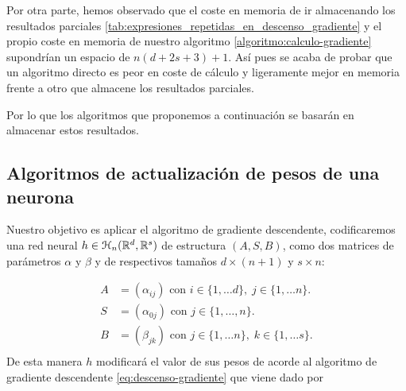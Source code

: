 Por otra parte, hemos observado que el coste en memoria de ir almacenando los resultados parciales \ref{tab:expresiones_repetidas_en_descenso_gradiente} y el propio coste en memoria de nuestro algoritmo \ref{algoritmo:calculo-gradiente} supondrían un espacio de $n (d + 2s +3) +1$.
Así pues se acaba de probar que un algoritmo directo es peor en coste de cálculo y ligeramente mejor en memoria frente a otro que almacene los resultados parciales. 

Por lo que los algoritmos que proponemos a continuación se basarán en almacenar estos resultados. 

\subsection{Algoritmos de actualización de pesos de una neurona}

Nuestro objetivo es aplicar el algoritmo de gradiente descendente, codificaremos una red neural $h \in \mathcal{H}_n(\mathbb{R}^d,\mathbb{R}^s)$ de estructura $(A,S,B)$, como dos matrices de parámetros $\alpha$ y $\beta$ y de respectivos tamaños $d \times(n+1)$ y $s \times n$: 

\begin{align}\label{eq:representation red neuronal}
    A &= (\alpha_{i j}) \text{ con }  i \in \{1, \ldots d\}, \; j \in \{1, \ldots n\}. \\
    S &= (\alpha_{0 j}) \text{ con }  j \in \{1, \ldots, n\}. \\
    B &= (\beta_{j k}) \text{ con }  j \in \{1, \ldots n\}, \; k \in \{1, \ldots s\}.\\
\end{align}
 De esta manera $h$ modificará el valor de sus pesos de acorde al algoritmo de gradiente descendente \ref{eq:descenso-gradiente} que viene dado por

